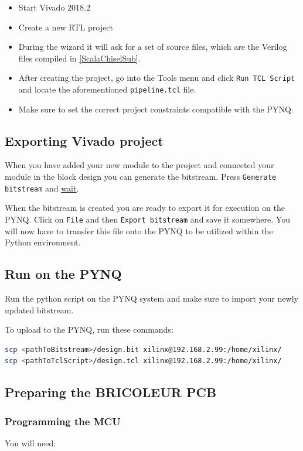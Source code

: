 \begin{itemize}
    \item Start Vivado 2018.2
    \item Create a new RTL project
    \item During the wizard it will ask for a set of source files, which are the Verilog files compiled in \ref{ScalaChiselSub}.
    \item After creating the project, go into the Tools menu and click \texttt{Run TCL Script} and locate the aforementioned \texttt{pipeline.tcl} file.
    \item Make sure to set the correct project constraints compatible with the PYNQ.
\end{itemize}

\subsection{Exporting Vivado project}
When you have added your new module to the project and connected your module in the block design you can generate the bitstream. Press \texttt{Generate bitstream} and \underline{\underline{wait}}.

When the bitstream is created you are ready to export it for execution on the PYNQ. Click on \texttt{File} and then \texttt{Export bitstream} and save it somewhere. You will now have to transfer this file onto the PYNQ to be utilized within the Python environment.

\subsection{Run on the PYNQ}
Run the python script on the PYNQ system and make sure to import your newly updated bitstream.

To upload to the PYNQ, run these commands:
\lstset{basicstyle=\small}
\begin{lstlisting}[language=bash]
scp <pathToBitstream>/design.bit xilinx@192.168.2.99:/home/xilinx/
scp <pathToTclScript>/design.tcl xilinx@192.168.2.99:/home/xilinx/
\end{lstlisting}

\subsection{Preparing the BRICOLEUR PCB}

\subsubsection{Programming the MCU}
You will need: 

